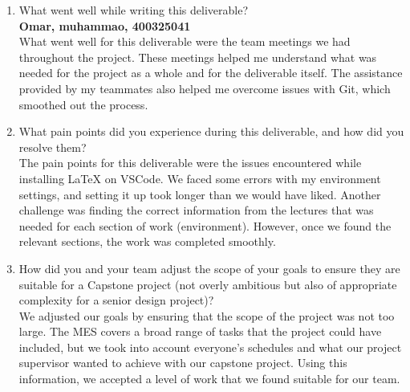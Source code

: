 \documentclass{article}
\begin{document}
\begin{enumerate}
    \item What went well while writing this deliverable? \\
    \textbf{Omar, muhammao, 400325041} \\
    What went well for this deliverable were the team meetings we had throughout the project. These meetings helped me understand what was needed for the project as a whole and for the deliverable itself. The assistance provided by my teammates also helped me overcome issues with Git, which smoothed out the process.
    \item What pain points did you experience during this deliverable, and how
    did you resolve them? \\
    The pain points for this deliverable were the issues encountered while installing LaTeX on VSCode. We faced some errors with my environment settings, and setting it up took longer than we would have liked. Another challenge was finding the correct information from the lectures that was needed for each section of work (environment). However, once we found the relevant sections, the work was completed smoothly.
    \item How did you and your team adjust the scope of your goals to ensure
    they are suitable for a Capstone project (not overly ambitious but also of
    appropriate complexity for a senior design project)? \\
    We adjusted our goals by ensuring that the scope of the project was not too large. The MES covers a broad range of tasks that the project could have included, but we took into account everyone’s schedules and what our project supervisor wanted to achieve with our capstone project. Using this information, we accepted a level of work that we found suitable for our team.
\end{enumerate}  
\end{document}
